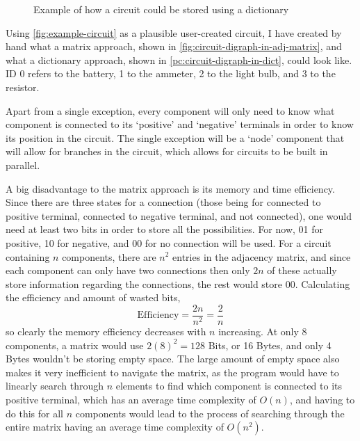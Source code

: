         

        \begin{figure}[!ht]
            \inputminted[linenos]{json}{figures/s05/design/example-circuit-dict.json}
            \caption{Example of how a circuit could be stored using a dictionary}
            \label{pc:circuit-digraph-in-dict}
        \end{figure}

        Using \autoref{fig:example-circuit} as a plausible user-created circuit, I have created by hand what a matrix approach, shown in \autoref{fig:circuit-digraph-in-adj-matrix}, and what a dictionary approach, shown in \autoref{pc:circuit-digraph-in-dict}, could look like. 
        ID 0 refers to the battery, 1 to the ammeter, 2 to the light bulb, and 3 to the resistor. 

        Apart from a single exception, every component will only need to know what component is connected to its `positive' and `negative' terminals in order to know its position in the circuit. 
        The single exception will be a `node' component that will allow for branches in the circuit, which allows for circuits to be built in parallel. 

        A big disadvantage to the matrix approach is its memory and time efficiency. 
        Since there are three states for a connection (those being for connected to positive terminal, connected to negative terminal, and not connected), one would need at least two bits in order to store all the possibilities. 
        For now, 01 for positive, 10 for negative, and 00 for no connection will be used. 
        For a circuit containing \(n \) components, there are \(n^2\) entries in the adjacency matrix, and since each component can only have two connections then only \(2n\) of these actually store information regarding the connections, the rest would store 00. 
        Calculating the efficiency and amount of wasted bits,
        \[ \text{Efficiency} = \frac{2n}{n^2} = \frac{2}{n } \]
        so clearly the memory efficiency decreases with \(n\) increasing. 
        At only 8 components, a matrix would use \(2(8)^2 = 128\) Bits, or 16 Bytes, and only 4 Bytes wouldn't be storing empty space. 
        The large amount of empty space also makes it very inefficient to navigate the matrix, as the program would have to linearly search through \(n \) elements to find which component is connected to its positive terminal, which has an average time complexity of \(O(n)\), and having to do this for all \(n \) components would lead to the process of searching through the entire matrix having an average time complexity of \(O(n^2)\). 

